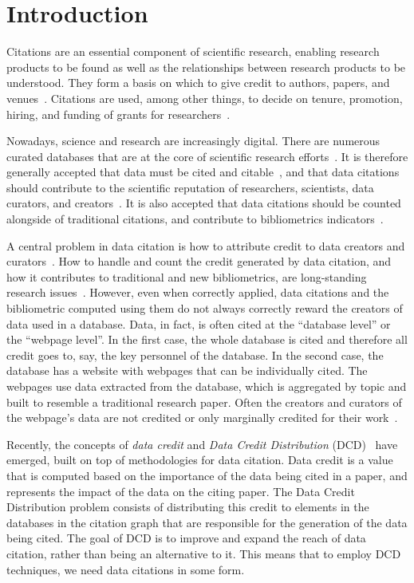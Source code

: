 \section{Introduction}

Citations are an essential component of scientific research, enabling research products to be found as well as the relationships between research products to be understood. 
They form a basis on which to give credit to authors, papers, and venues~\citep{ZouP16, cousijn2019bringing, cronin1984}.
Citations are used, among other things, to decide on tenure, promotion, hiring, and funding of grants for researchers~\citep{meho2007impact, Cronin01, Hartley17, Kosten16}.

Nowadays, science and research are increasingly digital. There are numerous curated databases that are at the core of scientific research efforts~\citep{bunemann2016citation}.
It is therefore generally accepted that data must be cited and citable~\citep{LawrenceEtAl2011,CallaghanDPTCKABBLLMHSWW12}, and that data citations should contribute to the scientific reputation of researchers, scientists, data curators, and creators~\citep{AltmanEtAl2015,Spengler2012}.
It is also accepted that data citations should be counted alongside of traditional citations, and contribute to bibliometrics indicators~\citep{Belter2014,Peters2016}.

A central problem in data citation is how to attribute credit to data creators and curators~\citep{buneman2019summ}. 
How to handle and count the credit generated by data citation, and how it contributes to traditional and new bibliometrics, are long-standing research issues~\citep{garfield1999journal,Borgman2016}.
However, even when correctly applied, data citations and the bibliometric computed using them do not always correctly reward the creators of data used in a database.
Data, in fact, is often cited at the ``database level'' or the ``webpage level''. 
In the first case, the whole database is cited and therefore all credit goes to, say, the key personnel of the database.
In the second case, the database has a website with webpages that can be individually cited. 
The webpages use data extracted from the database, which is aggregated by topic and built to resemble a traditional research paper.
Often the creators and curators of the webpage's data are not credited or only marginally credited for their work~\citep{AlawiniDSTW17}.

Recently, the concepts of \emph{data credit} and \emph{Data Credit Distribution} (DCD)~\citep{creditFang18,transitiveCreditKatz2014,zeng2020assigning} have emerged, built on top of methodologies for data citation. 
Data credit is a value that is computed based on the importance of the data being cited in a paper, and represents the impact of the data on the citing paper. 
The Data Credit Distribution problem consists of distributing this credit to elements in the databases in the citation graph that are responsible for the generation of the data being cited. The goal of DCD is to improve and expand the reach of data citation, rather than being an alternative to it. This means that to employ DCD techniques, we need data citations in some form.

